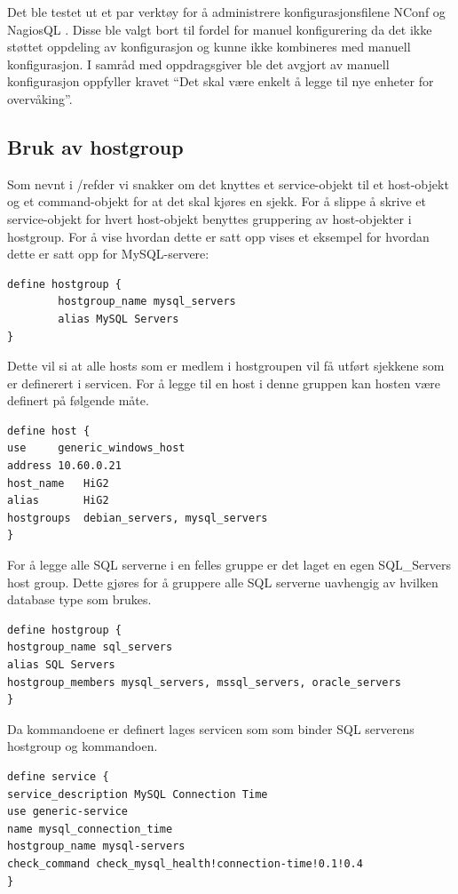 Det ble testet ut et par verktøy for å administrere konfigurasjonsfilene NConf \cite{nconf} og NagiosQL \cite{nagiosql}. Disse ble valgt bort til fordel for manuel konfigurering da det ikke støttet oppdeling av konfigurasjon og kunne ikke kombineres med manuell konfigurasjon. I samråd med oppdragsgiver ble det avgjort av manuell konfigurasjon oppfyller kravet “Det skal være enkelt å legge til nye enheter for overvåking”.

\subsection{Bruk av hostgroup}
Som nevnt i /ref{der vi snakker om det} knyttes et service-objekt til et host-objekt og et command-objekt for at det skal kjøres en sjekk. For å slippe å skrive et service-objekt for hvert host-objekt benyttes gruppering av host-objekter i hostgroup. For å vise hvordan dette er satt opp vises et eksempel for hvordan dette er satt opp for MySQL-servere:

\begin{lstlisting}
define hostgroup {
        hostgroup_name mysql_servers
        alias MySQL Servers
}
\end{lstlisting}
Dette vil si at alle hosts som er medlem i hostgroupen vil få utført sjekkene som er definerert i servicen. For å legge til en host i denne gruppen kan hosten være definert på følgende måte.

\begin{lstlisting}
define host {
use		generic_windows_host
address	10.60.0.21
host_name	HiG2
alias		HiG2
hostgroups	debian_servers, mysql_servers
}
\end{lstlisting}
For å legge alle SQL serverne i en felles gruppe er det laget en egen SQL\_Servers host group. Dette gjøres for å gruppere alle SQL serverne uavhengig av hvilken database type som brukes. 

\begin{lstlisting}
define hostgroup {
hostgroup_name sql_servers
alias SQL Servers
hostgroup_members mysql_servers, mssql_servers, oracle_servers
}
\end{lstlisting}
Da kommandoene er definert lages servicen som som binder SQL serverens hostgroup og kommandoen.

\begin{lstlisting}
define service {
service_description MySQL Connection Time
use generic-service
name mysql_connection_time
hostgroup_name mysql-servers
check_command check_mysql_health!connection-time!0.1!0.4
}
\end{lstlisting}

